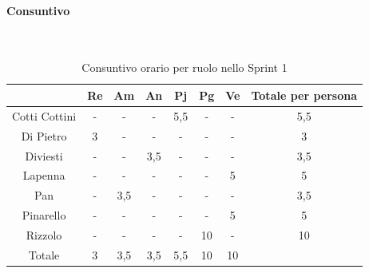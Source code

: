\documentclass{article}
\begin{document}
                \paragraph{Consuntivo}\mbox{}\\
                \begin{table}[H]
                    \centering
                    \begin{tabular}{|c|c|c|c|c|c|c|c|}
                    \hline
                                    & Re  & Am  & An  & Pj  & Pg  & Ve  & Totale per persona \\ \hline
                    Cotti Cottini & -   & -   & -   & 5,5 & -   & -   & 5,5                \\ \hline
                    Di Pietro     & 3   & -   & -   & -   & -   & -   & 3                  \\ \hline
                    Diviesti      & -   & -   & 3,5 & -   & -   & -   & 3,5                \\ \hline
                    Lapenna       & -   & -   & -   & -   & -   & 5   & 5                  \\ \hline
                    Pan           & -   & 3,5 & -   & -   & -   & -   & 3,5                \\ \hline
                    Pinarello     & -   & -   & -   & -   & -   & 5   & 5                  \\ \hline
                    Rizzolo       & -   & -   & -   & -   & 10  & -   & 10                 \\ \hline
                    Totale        & 3   & 3,5 & 3,5 & 5,5 & 10  & 10  &                    \\ \hline
                    \end{tabular}
                    \caption{Consuntivo orario per ruolo nello Sprint 1}
                \end{table}

\end{document}
